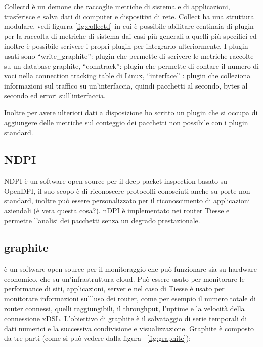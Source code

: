 Collectd è un demone che raccoglie metriche di sistema e di applicazioni, trasferisce e salva dati di computer e dispositivi di rete. Collect ha una struttura modulare, vedi figurra \ref{fig:collectd} in cui è possibile abilitare centinaia di plugin per la raccolta di metriche di sistema dai casi più generali a quelli più specifici ed inoltre è possibile scrivere i propri plugin per integrarlo ulteriormente. I plugin usati sono ``write\_graphite'': plugin che permette di scrivere le metriche raccolte su un database graphite, ``conntrack'': plugin che permette di contare il numero di voci nella connection tracking table di Linux, ``interface'' : plugin che colleziona informazioni sul traffico su un'interfaccia, quindi pacchetti al secondo, bytes al secondo ed errori sull'interfaccia. 

Inoltre per avere ulteriori dati a disposizione ho scritto un plugin che si occupa di aggiungere delle metriche sul conteggio dei pacchetti non possibile con i plugin standard.




\subsection{NDPI} 
NDPI è un software open-source per il deep-packet inspection basato su OpenDPI, il suo scopo è di riconoscere protocolli conosciuti anche su porte non standard, \uline{inoltre può essere personalizzato per il riconoscimento di applicazioni aziendali (è vera questa cosa?)}. nDPI è implementato nei router Tiesse e permette l'analisi dei pacchetti senza un degrado prestazionale.


\subsection{graphite} è un software open source per il monitoraggio che può funzionare sia su hardware economico, che su un'infrastruttura cloud. Può essere usato per monitorare le performance di siti, applicazioni, server e nel caso di Tiesse è usato per monitorare informazioni sull'uso dei router, come per esempio il numero totale di router connessi, quelli raggiungibili, il throughput, l'uptime e la velocità della connessione xDSL.
L'obiettivo di graphite è il salvataggio di serie temporali di dati numerici e la successiva condivisione e visualizzazione.
Graphite è composto da tre parti (come si può vedere dalla figura ~\ref{fig:graphite}):

